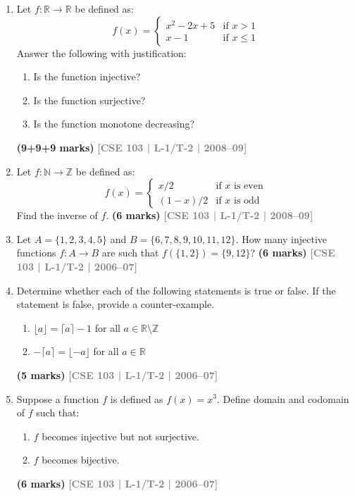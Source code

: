 \documentclass[12pt,a3paper]{article}
\newcommand{\yr}[1]{\hfill\textcolor{gray}{\small\textbf{[#1]}}}
\newcommand{\mk}[1]{\textcolor{orange!70!black}{\small\textbf{(#1 marks)}}}
\begin{document}
\begin{enumerate}
\item Let $f: \mathbb{R} \to \mathbb{R}$ be defined as:
\[
  f(x) = \begin{cases} x^2 - 2x + 5 & \text{if } x > 1 \\ x - 1 & \text{if } x \leq 1 \end{cases}
\]
Answer the following with justification:
\begin{enumerate}
  \item Is the function injective?
  \item Is the function surjective?
  \item Is the function monotone decreasing?
\end{enumerate}
\mk{9+9+9} \yr{CSE 103 | L-1/T-2 | 2008--09}

\item Let $f: \mathbb{N} \to \mathbb{Z}$ be defined as:
\[
  f(x) = \begin{cases} x/2 & \text{if } x \text{ is even} \\ (1-x)/2 & \text{if } x \text{ is odd} \end{cases}
\]
Find the inverse of $f$.
\mk{6} \yr{CSE 103 | L-1/T-2 | 2008--09}

\item Let $A = \{1,2,3,4,5\}$ and $B = \{6,7,8,9,10,11,12\}$. How many injective functions $f: A \to B$ are such that $f(\{1,2\}) = \{9,12\}$?
\mk{6} \yr{CSE 103 | L-1/T-2 | 2006--07}

\item Determine whether each of the following statements is true or false. If the statement is false, provide a counter-example.
\begin{enumerate}
  \item $\lfloor a \rfloor = \lceil a \rceil - 1$ for all $a \in \mathbb{R} \setminus \mathbb{Z}$
  \item $-\lceil a \rceil = \lfloor -a \rfloor$ for all $a \in \mathbb{R}$
\end{enumerate}
\mk{5} \yr{CSE 103 | L-1/T-2 | 2006--07}

\item Suppose a function $f$ is defined as $f(x) = x^3$. Define domain and codomain of $f$ such that:
\begin{enumerate}
  \item $f$ becomes injective but not surjective.
  \item $f$ becomes bijective.
\end{enumerate}
\mk{6} \yr{CSE 103 | L-1/T-2 | 2006--07}


\end{enumerate}
\end{document}
